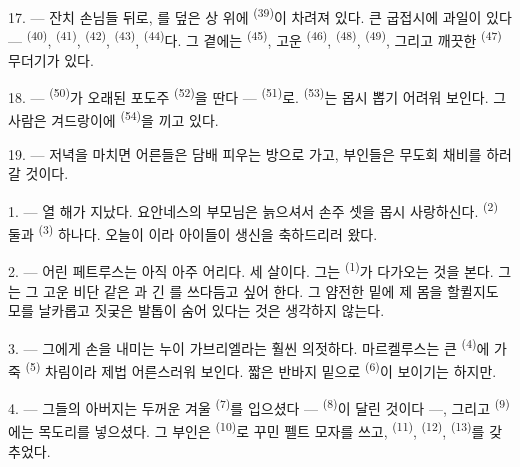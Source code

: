 \VUsaut{2.4mm}
\VUsaut{3.0mm}

17. --- 잔치 손님들 뒤로, 를 덮은 상 위에 
\textsuperscript{(39)}이 차려져 있다. 큰 굽접시에 과일이 있다 — 
\textsuperscript{(40)},  \textsuperscript{(41)}, 
\textsuperscript{(42)},  \textsuperscript{(43)}, 
\textsuperscript{(44)}다. 그 곁에는  \textsuperscript{(45)}, 고운
 \textsuperscript{(46)},  \textsuperscript{(48)},
 \textsuperscript{(49)}, 그리고 깨끗한 
\textsuperscript{(47)} 무더기가 있다.

18. ---  \textsuperscript{(50)}가 오래된 포도주 
\textsuperscript{(52)}을 딴다 —  \textsuperscript{(51)}로.
 \textsuperscript{(53)}는 몹시 뽑기 어려워 보인다. 그 사람은
겨드랑이에  \textsuperscript{(54)}을 끼고 있다.

19. --- 저녁을 마치면 어른들은 담배 피우는 방으로 가고, 부인들은 무도회 채비를 하러 갈
것이다.

\VUsaut{5.0mm}
\VUsaut{1.6mm}
\VUsaut{2.6mm}

\VUsaut{3.0mm}

1. --- 열 해가 지났다. 요안네스의 부모님은 늙으셔서 손주 셋을 몹시 사랑하신다.
 \textsuperscript{(2)} 둘과  \textsuperscript{(3)} 하나다. 오늘이
이라 아이들이 생신을 축하드리러 왔다.

2. --- 어린 페트루스는 아직 아주 어리다. 세 살이다. 그는 
\textsuperscript{(1)}가 다가오는 것을 본다. 그는 그 고운 비단 같은 과 긴
를 쓰다듬고 싶어 한다. 그 얌전한  밑에 제 몸을 할퀼지도 모를
날카롭고 짓궂은 발톱이 숨어 있다는 것은 생각하지 않는다.

3. --- 그에게 손을 내미는 누이 가브리엘라는 훨씬 의젓하다. 마르켈루스는 큰
 \textsuperscript{(4)}에 가죽  \textsuperscript{(5)} 차림이라
제법 어른스러워 보인다. 짧은 반바지 밑으로  \textsuperscript{(6)}이 보이기는
하지만.

4. --- 그들의 아버지는 두꺼운 겨울  \textsuperscript{(7)}를 입으셨다 —
 \textsuperscript{(8)}이 달린 것이다 —, 그리고 
\textsuperscript{(9)}에는 목도리를 넣으셨다. 그 부인은 
\textsuperscript{(10)}로 꾸민 펠트 모자를 쓰고,  \textsuperscript{(11)},
 \textsuperscript{(12)},  \textsuperscript{(13)}를 갖추었다.

